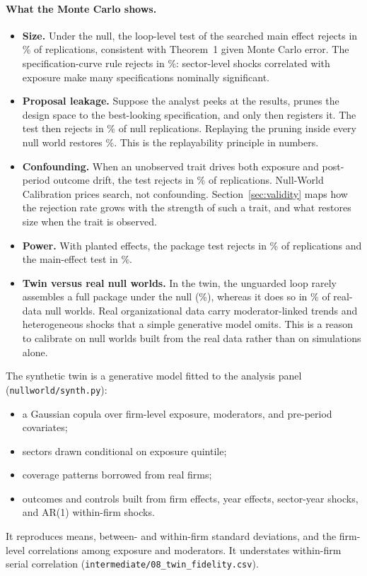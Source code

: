 \documentclass[11pt]{article}
\theoremstyle{remark}\newtheorem{remark}{Remark}
\begin{document}
\paragraph{What the Monte Carlo shows.}
\begin{itemize}
\item \textbf{Size.} Under the null, the loop-level test of the searched main effect rejects in \MCsizeNWC\% of replications,
consistent with Theorem~1 given Monte Carlo error. The specification-curve rule rejects in \MCsizeSpec\%: sector-level shocks
correlated with exposure make many specifications nominally significant.
\item \textbf{Proposal leakage.} Suppose the analyst peeks at the results, prunes the design space to the best-looking
specification, and only then registers it. The test then rejects in \MCsizeLeak\% of null replications. Replaying the
pruning inside every null world restores \MCsizeLeakReplay\%. This is the replayability principle in numbers.
\item \textbf{Confounding.} When an unobserved trait drives both exposure and post-period outcome drift, the test rejects
in \MCsizeConf\% of replications. Null-World Calibration prices search, not confounding. Section~\ref{sec:validity} maps
how the rejection rate grows with the strength of such a trait, and what restores size when the trait is observed.
\item \textbf{Power.} With planted effects, the package test rejects in \MCpowerNWC\% of replications and the main-effect test
in \MCpowerNWChOne\%.
\item \textbf{Twin versus real null worlds.} In the twin, the unguarded loop rarely assembles a full package under the null
(\MCsizeU\%), whereas it does so in \PotemU\% of real-data null worlds. Real organizational data carry moderator-linked
trends and heterogeneous shocks that a simple generative model omits. This is a reason to calibrate on null worlds built from
the real data rather than on simulations alone.
\end{itemize}

The synthetic twin is a generative model fitted to the analysis panel (\texttt{nullworld/synth.py}):
\begin{itemize}
\item a Gaussian copula over firm-level exposure, moderators, and pre-period covariates;
\item sectors drawn conditional on exposure quintile;
\item coverage patterns borrowed from real firms;
\item outcomes and controls built from firm effects, year effects, sector-year shocks, and AR(1) within-firm shocks.
\end{itemize}
\begin{sloppypar}
It reproduces means, between- and within-firm standard deviations, and the firm-level correlations among exposure and
moderators. It understates within-firm serial correlation (\nolinkurl{intermediate/08_twin_fidelity.csv}).
\end{sloppypar}
\end{document}
